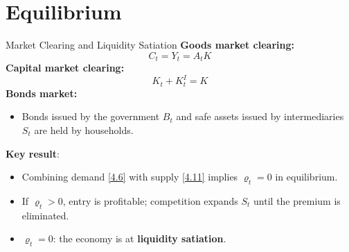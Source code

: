 \documentclass[11pt,aspectratio=169]{beamer}
\begin{document}

\section{Equilibrium}

\begin{frame}{Market Clearing and Liquidity Satiation}
\small
\textbf{Goods market clearing:} 
\[C_t=Y_t=A_tK\]
\textbf{Capital market clearing:}
\[K_t+K_t^I=K\]
\textbf{Bonds market: }
\begin{itemize}
    \item Bonds issued by the government $B_t$ and safe assets issued by intermediaries $S_t$ are held by households.
\end{itemize}

\textbf{Key result}: 
\begin{itemize}
\item Combining demand \eqref{4.6} with supply \eqref{4.11} implies $\varrho_t=0$ in equilibrium.
  \item If $\varrho_t>0$, entry is profitable; competition expands $S_t$ until the premium is eliminated.
  \item $\varrho_t=0$: the economy is at \textbf{liquidity satiation}.
\end{itemize}
\end{frame}
\end{document}
